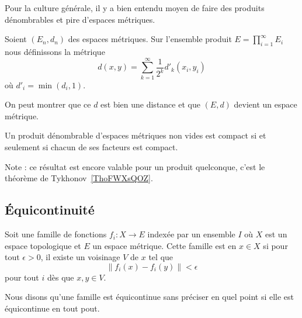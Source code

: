 Pour la culture générale, il y a bien entendu moyen de faire des produits dénombrables et pire d'espaces métriques.
\begin{definition}
    Soient \( (E_n,d_n)\) des espaces métriques. Sur l'ensemble produit \( E=\prod_{i=1}^{\infty}E_i\) nous définissons la métrique
    \begin{equation}
        d(x,y)=\sum_{k=1}^{\infty}\frac{1}{ 2^k }d'_k(x_i,y_i)
    \end{equation}
    où \( d'_i=\min(d_i,1)\).
\end{definition}
On peut montrer que ce \( d\) est bien une distance et que \( (E,d)\) devient un espace métrique.

\begin{theorem} \label{ThoKKBooNaZgoO}  %
    Un produit dénombrable d'espaces métriques non vides est compact si et seulement si chacun de ses facteurs est compact.
\end{theorem}
Note : ce résultat est encore valable pour un produit quelconque, c'est le théorème de Tykhonov~\ref{ThoFWXsQOZ}.

\subsection{Équicontinuité}

\begin{definition}       \label{DEFooSGMVooASNbxo}
    Soit une famille de fonctions \( f_i\colon X\to E\) indexée par un ensemble \( I\) où \( X\) est un espace topologique et \( E\) un espace métrique. Cette famille est  en \( x\in X\) si pour tout \( \epsilon>0\), il existe un voisinage \( V\) de \( x\) tel que
    \begin{equation}
        \| f_i(x)-f_i(y) \|<\epsilon
    \end{equation}
    pour tout \( i\) dès que \( x,y\in V\).

    Nous disons qu'une famille est équicontinue sans préciser en quel point si elle est équicontinue en tout pout.
\end{definition}


